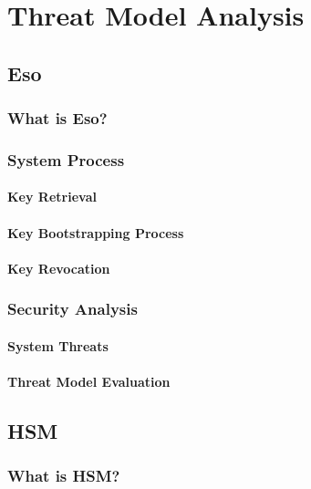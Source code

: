 \chapter{Threat Model Analysis}\label{C:solutionanalysis}
	
	\section{Eso}
		\subsection{What is Eso?}

		\subsection{System Process}

			\subsubsection{Key Retrieval}

			\subsubsection{Key Bootstrapping Process}

			\subsubsection{Key Revocation}

		\subsection{Security Analysis}

			\subsubsection{System Threats}

			\subsubsection{Threat Model Evaluation}

	\section{HSM}
		\subsection{What is HSM?}

